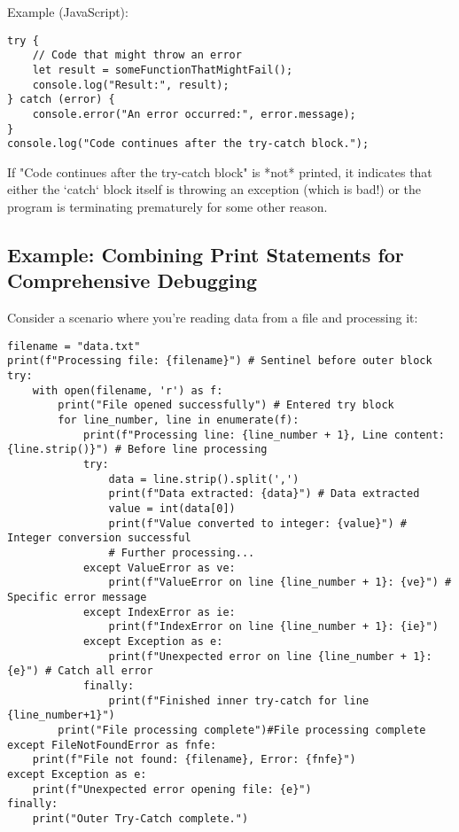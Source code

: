 \documentclass{article}
\begin{document}
{{{Example (JavaScript):

\begin{verbatim}
try {
    // Code that might throw an error
    let result = someFunctionThatMightFail();
    console.log("Result:", result);
} catch (error) {
    console.error("An error occurred:", error.message);
}
console.log("Code continues after the try-catch block.");
\end{verbatim}

If "Code continues after the try-catch block" is *not* printed, it indicates that either the `catch` block itself is throwing an exception (which is bad!) or the program is terminating prematurely for some other reason.

\subsection*{Example: Combining Print Statements for Comprehensive Debugging}

Consider a scenario where you're reading data from a file and processing it:

\begin{verbatim}
filename = "data.txt"
print(f"Processing file: {filename}") # Sentinel before outer block
try:
    with open(filename, 'r') as f:
        print("File opened successfully") # Entered try block
        for line_number, line in enumerate(f):
            print(f"Processing line: {line_number + 1}, Line content: {line.strip()}") # Before line processing
            try:
                data = line.strip().split(',')
                print(f"Data extracted: {data}") # Data extracted
                value = int(data[0])
                print(f"Value converted to integer: {value}") # Integer conversion successful
                # Further processing...
            except ValueError as ve:
                print(f"ValueError on line {line_number + 1}: {ve}") # Specific error message
            except IndexError as ie:
                print(f"IndexError on line {line_number + 1}: {ie}")
            except Exception as e:
                print(f"Unexpected error on line {line_number + 1}: {e}") # Catch all error
            finally:
                print(f"Finished inner try-catch for line {line_number+1}")
        print("File processing complete")#File processing complete
except FileNotFoundError as fnfe:
    print(f"File not found: {filename}, Error: {fnfe}")
except Exception as e:
    print(f"Unexpected error opening file: {e}")
finally:
    print("Outer Try-Catch complete.")
\end{verbatim}

}}}
\end{document}
